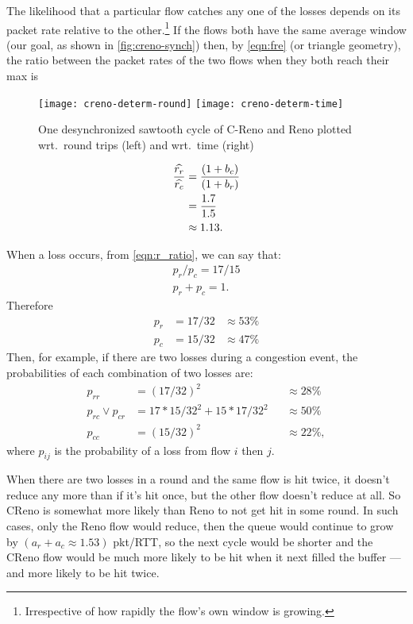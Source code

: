 The likelihood that a particular flow catches any one of the losses depends on its packet rate relative to the other.\footnote{Irrespective of how rapidly the flow's own window is growing.}
If the flows both have the same average window (our goal, as shown in \autoref{fig:creno-synch})
then, by \autoref{eqn:fre} (or triangle geometry), the ratio between the packet rates of the two flows when they both reach their max is
\begin{figure*}
	\centering
	\texttt{[image: creno-determ-round]}
	\texttt{[image: creno-determ-time]}
	\caption{One desynchronized sawtooth cycle of C-Reno and Reno plotted wrt.\ round trips (left) and wrt.\ time (right)}\label{fig:creno-determ}
\end{figure*}

\begin{align}
\frac{\widehat{r_r}}{\widehat{r_c}} &= \frac{(1 + b_c)}{(1 + b_r)}\notag\\
        &= \frac{1.7}{1.5}\notag\\
        &\approx 1.13.\label{eqn:r_ratio}
\end{align}

When a loss occurs, from \autoref{eqn:r_ratio}, we can say that:
\begin{align}
p_r / p_c = 17/15\label{eqn:p_ratio}\\
p_r + p_c = 1.
\end{align}
Therefore
\begin{align*}
p_r &= 17/32 &\approx 53\%\\
p_c &= 15/32 &\approx 47\%
\end{align*}
Then, for example, if there are two losses during a congestion event, the probabilities of each combination of two losses are:
\begin{align*}
p_{rr}              &= (17/32)^2               &&\approx 28\%\\
p_{rc} \lor p_{cr}  &= 17*15/32^2 + 15*17/32^2 &&\approx 50\%\\
p_{cc}              &= (15/32)^2               &&\approx 22\%,
\end{align*}
where \(p_{ij}\) is the probability of a loss from flow \(i\) then \(j\).

When there are two losses in a round and the same flow is hit twice, it doesn't reduce any more than if it's hit once, but the other flow doesn't reduce at all. So CReno is somewhat more likely than Reno to not get hit in some round. In such cases, only the Reno flow would reduce, then the queue would continue to grow by \((a_r + a_c \approx 1.53)\) pkt/RTT, so the next cycle would be shorter and the CReno flow would be much more likely to be hit when it next filled the buffer --- and more likely to be hit twice.

